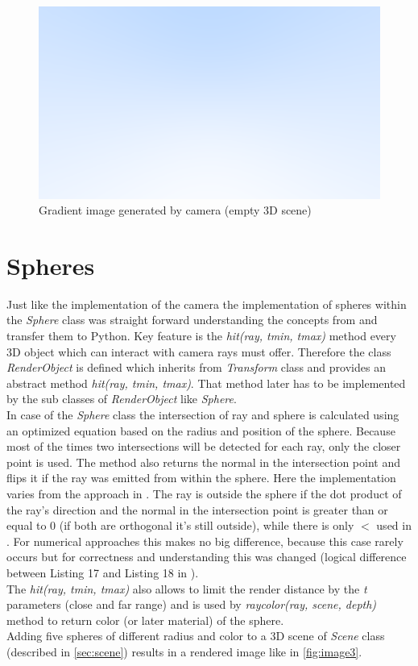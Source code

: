 \documentclass[]{article}
\begin{document}
	\begin{figure}[h]
		\centering
		\includegraphics[width=0.9\linewidth]{image2}
		\caption{Gradient image generated by camera (empty 3D scene)}
		\label{fig:image2}
	\end{figure}

	\section{Spheres}
	Just like the implementation of the camera the implementation of spheres within the \emph{Sphere} class was straight forward understanding the concepts from \cite{Shirley2020RTW1} and transfer them to Python. Key feature is the \emph{hit(ray, t\textunderscore min, t\textunderscore max)} method every 3D object which can interact with camera rays must offer. Therefore the class \emph{RenderObject} is defined which inherits from \emph{Transform} class and provides an abstract method \emph{hit(ray, t\textunderscore min, t\textunderscore max)}. That method later has to be implemented by the sub classes of \emph{RenderObject} like \emph{Sphere}.
	\\
	In case of the \emph{Sphere} class the intersection of ray and sphere is calculated using an optimized equation based on the radius and position of the sphere. Because most of the times two intersections will be detected for each ray, only the closer point is used. The method also returns the normal in the intersection point and flips it if the ray was emitted from within the sphere. Here the implementation varies from the approach in \cite{Shirley2020RTW1}. The ray is outside the sphere if the dot product of the ray’s direction and the normal in the intersection point is greater than or equal to 0 (if both are orthogonal it’s still outside), while there is only $<$ used in \cite{Shirley2020RTW1}. For numerical approaches this makes no big difference, because this case rarely occurs but for correctness and understanding this was changed (logical difference between Listing 17 and Listing 18 in \cite{Shirley2020RTW1}).
	\\
	The \emph{hit(ray, t\textunderscore min, t\textunderscore max)} also allows to limit the render distance by the \emph{t} parameters (close and far range) and is used by \emph{ray\textunderscore color(ray, scene, depth)} method to return color (or later material) of the sphere.
	\\
	Adding five spheres of different radius and color to a 3D scene of \emph{Scene} class (described in \cref{sec:scene}) results in a rendered image like in \cref{fig:image3}.
	
\end{document}
